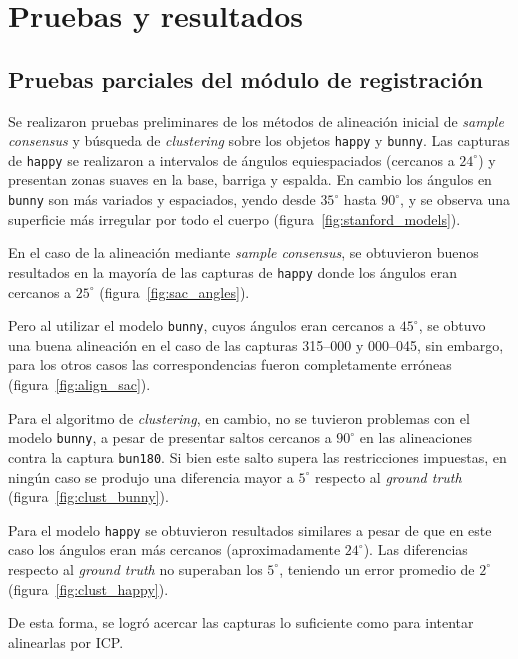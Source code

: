 \chapter{Pruebas y resultados}

\section{Pruebas parciales del módulo de registración}
	Se realizaron pruebas preliminares de los métodos de alineación inicial
	de \emph{sample consensus} y búsqueda de \emph{clustering}
	sobre los objetos \texttt{happy} y \texttt{bunny}.
	Las capturas de \texttt{happy} se realizaron a intervalos de ángulos equiespaciados (cercanos a $24^{\circ}$) y
	presentan zonas suaves en la base, barriga y espalda.
	En cambio los ángulos en \texttt{bunny} son más variados y espaciados, yendo desde $35^{\circ}$ hasta $90^{\circ}$,
	y se observa una superficie más irregular por todo el cuerpo (figura~\ref{fig:stanford_models}).%

	En el caso de la alineación mediante \emph{sample consensus},
	se obtuvieron buenos resultados en la mayoría de las capturas de \texttt{happy}
	donde los ángulos eran cercanos a $25^{\circ}$ (figura~\ref{fig:sac_angles}). 

	Pero al utilizar el modelo \texttt{bunny}, cuyos ángulos eran cercanos a $45^{\circ}$,
	se obtuvo una buena alineación en el caso de las capturas 315--000 y 000--045,
	sin embargo, para los otros casos las correspondencias fueron completamente erróneas (figura~\ref{fig:align_sac}).

	Para el algoritmo de \emph{clustering}, en cambio,
	no se tuvieron problemas con el modelo \texttt{bunny},
	a pesar de presentar saltos cercanos a $90^{\circ}$ en las alineaciones
	contra la captura \texttt{bun180}. Si bien este salto supera las restricciones impuestas,
	en ningún caso se produjo una diferencia mayor a $5^{\circ}$ respecto al \emph{ground truth} (figura~\ref{fig:clust_bunny}).

	Para el modelo \texttt{happy} se obtuvieron resultados similares a pesar de que en este
	caso los ángulos eran más cercanos (aproximadamente $24^{\circ}$).  Las
	diferencias respecto al \emph{ground truth} no superaban los $5^{\circ}$,
	teniendo un error promedio de $2^{\circ}$ (figura~\ref{fig:clust_happy}).

	De esta forma, se logró acercar las capturas lo suficiente como
	para intentar alinearlas por ICP.


